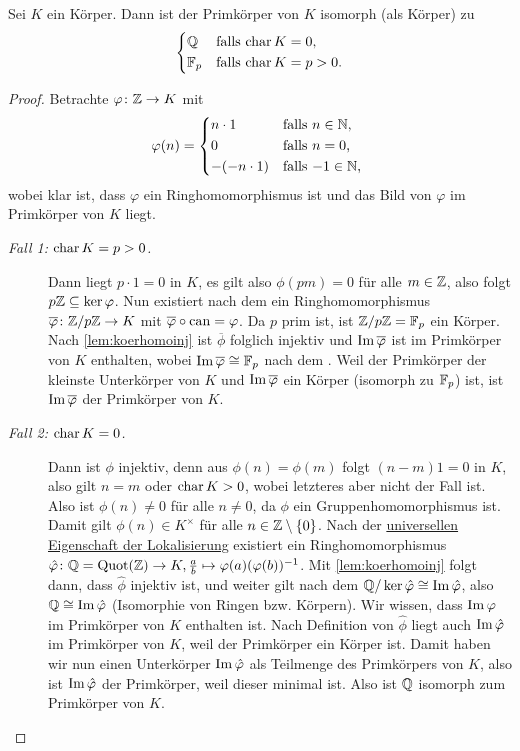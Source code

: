 \documentclass[12pt,a4paper]{scrartcl}
\begin{document}
\begin{satz} Sei $K$ ein Körper. Dann ist der Primkörper von $K$ isomorph \textup(als Körper\textup) zu \[\begin{cases*} \IQ& falls $\chr K =0$,\\
	\IF_p& falls $\chr K = p > 0$.\end{cases*}\]
\end{satz}

\begin{proof}
	Betrachte $\varphi\colon \mathbb Z\to K$ mit 
	\[
		\phi(n) = \begin{cases*}
		n \cdot 1 & falls $n \in \IN$,\\
		0 & falls $n=0$,\\
		-(-n\cdot 1) & falls $-1 \in \IN$,
		\end{cases*}
	\]
	wobei klar ist, dass $\varphi$ ein Ringhomomorphismus ist und das Bild von $\varphi$ im Primkörper von $K$ liegt.
	
	\begin{description}
		\item[\emph{Fall 1: $\operatorname{char} K = p > 0$.}] Dann liegt $p\cdot 1  = 0$ in $K$, es gilt also $\phi(pm) = 0$ für alle $m\in\mathbb Z$, also folgt $p\mathbb Z\subseteq \operatorname{ker} \varphi$. Nun existiert nach dem  ein Ringhomomorphismus $\overline{\varphi}\colon \mathbb Z/p\mathbb Z\to K$ mit $\overline{\varphi}\circ \operatorname{can}  = \varphi$. Da $p$ prim ist, ist $\mathbb Z/p\mathbb Z = \mathbb F_p$ ein Körper. Nach \cref{lem:koerhomoinj} ist $\overline{\phi}$ folglich injektiv und $\operatorname{Im}\overline{\varphi}$ ist im Primkörper von $K$ enthalten, wobei $\operatorname{Im}\overline{\varphi} \cong \mathbb F_p$ nach dem . Weil der Primkörper der kleinste Unterkörper von $K$ und $\operatorname{Im}\overline{\varphi}$ ein Körper (isomorph zu $\mathbb F_p$) ist, ist $\operatorname{Im} \overline {\varphi}$ der Primkörper von $K$.
		\item[\emph{Fall 2: $\operatorname{char} K = 0$.}] Dann ist $\phi$ injektiv, denn aus $\phi(n) = \phi(m)$ folgt $(n-m)1 = 0$ in $K$, also gilt $n = m$ oder  $\operatorname{char} K > 0$, wobei letzteres aber nicht der Fall ist. Also ist $\phi(n) \neq 0$ für alle $n\neq 0$, da $\phi$ ein Gruppenhomomorphismus ist. Damit gilt $\phi(n)\in K^{\times}$ für alle $n \in \mathbb Z\setminus\{0\}$. Nach der \hyperref[thm:unieig_lokali]{universellen Eigenschaft der Lokalisierung} existiert ein Ringhomomorphismus $\hat{\varphi}\colon \mathbb Q= \operatorname{Quot} (\mathbb Z)\to K, \frac ab \mapsto \varphi(a)(\varphi(b))^{-1}$. Mit \cref{lem:koerhomoinj} folgt dann, dass $\hat{\phi}$ injektiv ist, und weiter gilt nach dem  $\mathbb Q/\operatorname{ker}\hat{\varphi} \cong \operatorname{Im}\hat{\varphi}$, also $\mathbb Q \cong \operatorname{Im} \hat{\varphi}$ (Isomorphie von Ringen bzw. Körpern). Wir wissen, dass $\operatorname{Im} \varphi$ im Primkörper von $K$ enthalten ist. Nach Definition von $\hat{\phi}$ liegt auch $\operatorname{Im}\hat{\varphi}$ im Primkörper von $K$, weil der Primkörper ein Körper ist. Damit haben wir nun einen Unterkörper $\operatorname{Im} \hat{\varphi}$ als Teilmenge des Primkörpers von $K$, also ist $\operatorname{Im} \hat{\varphi}$ der Primkörper, weil dieser minimal ist. Also ist $\mathbb Q$ isomorph zum Primkörper von $K$.
  \qedhere
	\end{description}
\end{proof}
\end{document}
